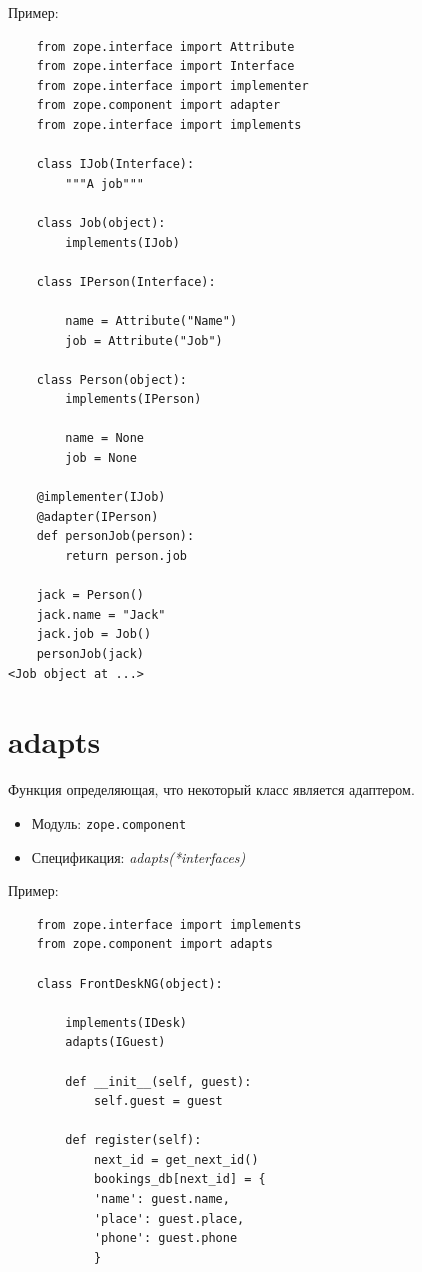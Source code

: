 \documentclass[a4paper,openany,twoside,draft]{book}
\providecommand*{\DUroletitlereference}[1]{\textsl{#1}}
\begin{document}
Пример:

\begin{verbatim}
    from zope.interface import Attribute
    from zope.interface import Interface
    from zope.interface import implementer
    from zope.component import adapter
    from zope.interface import implements

    class IJob(Interface):
        """A job"""

    class Job(object):
        implements(IJob)

    class IPerson(Interface):

        name = Attribute("Name")
        job = Attribute("Job")

    class Person(object):
        implements(IPerson)

        name = None
        job = None

    @implementer(IJob)
    @adapter(IPerson)
    def personJob(person):
        return person.job

    jack = Person()
    jack.name = "Jack"
    jack.job = Job()
    personJob(jack)
<Job object at ...>
\end{verbatim}


\section*{adapts%
  \label{adapts}%
}

Функция определяющая, что некоторый класс является адаптером.

\begin{itemize}

\item Модуль: \texttt{zope.component}

\item Спецификация: \DUroletitlereference{adapts(*interfaces)}

\end{itemize}

Пример:

\begin{verbatim}
    from zope.interface import implements
    from zope.component import adapts

    class FrontDeskNG(object):

        implements(IDesk)
        adapts(IGuest)

        def __init__(self, guest):
            self.guest = guest

        def register(self):
            next_id = get_next_id()
            bookings_db[next_id] = {
            'name': guest.name,
            'place': guest.place,
            'phone': guest.phone
            }
\end{verbatim}
\end{document}
